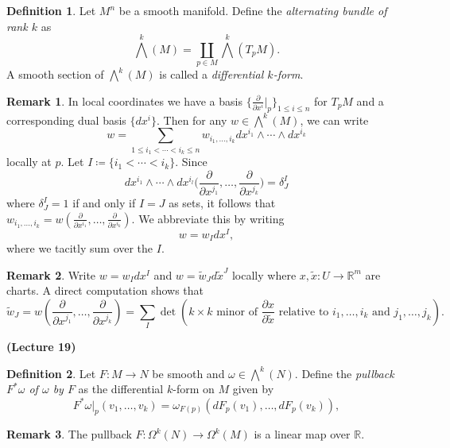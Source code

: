 \documentclass[10pt,letterpaper,cm]{nupset}
\theoremstyle{definition}
\newtheorem*{definition}{Definition}
\newtheorem{remark}{Remark}
\newcommand{\R}{\mathbb R}
\newcommand{\1}{\mathbf{1}}
\newcommand{\0}{\vec 0}
\begin{document}
\begin{definition}
Let $M^n$ be a smooth manifold. Define the \textit{alternating bundle of rank $k$} as $$\bigwedge^k(M) = \coprod_{p\in M} \bigwedge^k(T_pM).  $$ A smooth section of $\bigwedge^k(M)$ is called a \textit{differential $k$-form}.
\end{definition}

\begin{remark}
In local coordinates we have a basis $\{\frac{\partial}{\partial{x^i}}\rvert_p\}_{1\leq i \leq n}$ for $T_pM$ and a corresponding dual basis $\{dx^i\}$. Then for any $w \in \bigwedge^k(M)$, we can write $$ w = \sum_{1\leq i_1 < \cdots < i_k \leq n}w_{i_1, \ldots, i_k} dx^{i_1} \wedge \cdots \wedge dx^{i_k} $$ locally at $p$. Let $I\coloneqq  \{i_1 < \cdots < i_k\}$. Since $$dx^{i_1} \wedge \cdots \wedge dx^{i_l}\big( \frac{\partial}{\partial{x^{j_1}}}, \ldots, \frac{\partial}{\partial{x^{j_k}}} \big) = \delta^I_J$$ where $\delta^I_J = 1$ if and only if $I = J$ as sets, it follows that
$w_{i_1, \ldots, i_k}  = w(\frac{\partial}{\partial{x^{i_1}}}, \ldots, \frac{\partial}{\partial{x^{i_k}}}).$ We abbreviate this by writing $$w = w_I dx^I,$$ where we tacitly sum over the $I$.
\end{remark}

\begin{remark}
Write $w = w_Idx^I$ and $ w= \tilde{w}_J d\tilde{x}^J$ locally where $x, \tilde{x}: U \to \R^m$ are charts. A direct computation shows that $$\tilde{w}_J = w(\frac{\partial}{\partial{x^{j_1}}}, \ldots,  \frac{\partial}{\partial{x^{j_k}}}) = \sum_I \det(k \times k \text{ minor of }\frac{\partial{x}}{\partial{\tilde{x}}} \text{ relative to } i_1, \ldots, i_k \text{ and }j_1, \ldots, j_k). $$
\end{remark}

\begin{center}
{\textbf{(Lecture 19)}} 
\end{center}

\begin{definition}
Let $F: M \to N$ be smooth and $\omega \in \bigwedge^k(N)$. Define the \textit{pullback $F^{\ast}\omega$ of $\omega$ by $F$} as the differential $k$-form on $M$ given by $$F^{\ast} \omega\rvert_p(v_1, \ldots, v_k) = \omega_{F(p)}(dF_p(v_1), \ldots, dF_p(v_k)),$$
\end{definition}

\begin{remark}
The pullback $F : \Omega^k(N) \to \Omega^k(M)$ is a linear map over $\R$. 
\end{remark}
\end{document}
